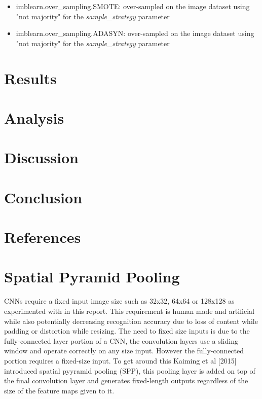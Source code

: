 \documentclass{article}
\begin{document}
\begin{itemize}
	\item imblearn.over\_sampling.SMOTE: over-sampled on the image dataset using "not majority" for the \textit{sample\_strategy} parameter
	
	\item imblearn.over\_sampling.ADASYN: over-sampled on the image dataset using "not majority" for the \textit{sample\_strategy} parameter
	
\end{itemize}



\section{Results}

\section{Analysis}

\section{Discussion}

\section{Conclusion	}

\section{References	}

\section{Spatial Pyramid Pooling}

CNNs require a fixed input image size such as 32x32, 64x64 or 128x128 as experimented with in this report. This requirement is human made and artificial while also potentially decreasing recognition accuracy due to loss of content while padding or distortion while resizing. The need to fixed size inputs is due to the fully-connected layer portion of a CNN, the convolution layers use a sliding window and operate correctly on any size input. However the fully-connected portion requires a fixed-size input. To get around this Kaiming et al [2015] introduced spatial pyyramid pooling (SPP), this pooling layer is added on top of the final convolution layer and generates fixed-length outputs regardless of the size of the feature maps given to it.  \\
\end{document}
